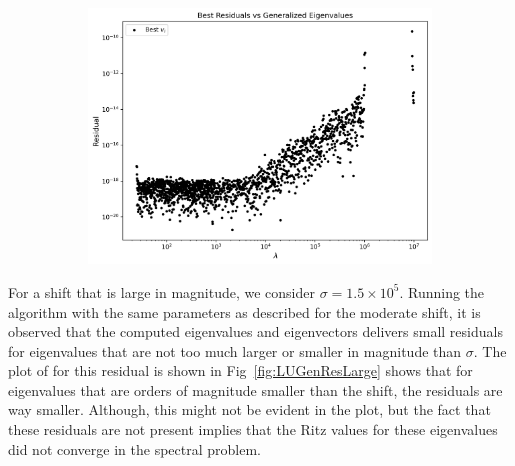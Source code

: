 \begin{figure}
	\begin{subfigure}{.5\textwidth}
		\centering
		\includegraphics[width=.8\linewidth]{./Plots/LU/residual_lu_bs.png}
		\caption{}
		\label{fig:LUBestResModerate}
	\end{subfigure}
\end{figure}


For a shift that is large in magnitude, we consider $\sigma = 1.5 \times 10^5$. Running the algorithm with the same parameters as described for the moderate shift, it is observed that the computed eigenvalues and eigenvectors delivers small residuals for eigenvalues that are not too much larger or smaller in magnitude than $\sigma$. The plot of for this residual is shown in Fig~\ref{fig:LUGenResLarge} shows that for eigenvalues that are orders of magnitude smaller than the shift, the residuals are way smaller. Although, this might not be evident in the plot, but the fact that these residuals are not present implies that the Ritz values for these eigenvalues did not converge in the spectral problem. 

